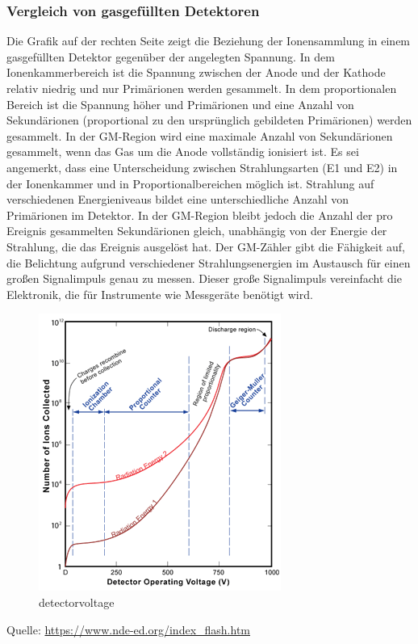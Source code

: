 {\subsubsection{Vergleich von gasgefüllten Detektoren}
Die Grafik auf der rechten Seite zeigt die Beziehung der Ionensammlung in einem gasgefüllten Detektor gegenüber der angelegten Spannung. In dem Ionenkammerbereich ist die Spannung zwischen der Anode und der Kathode relativ niedrig und nur Primärionen werden gesammelt. In dem proportionalen Bereich ist die Spannung höher und Primärionen und eine Anzahl von Sekundärionen (proportional zu den ursprünglich gebildeten Primärionen) werden gesammelt. In der GM-Region wird eine maximale Anzahl von Sekundärionen gesammelt, wenn das Gas um die Anode vollständig ionisiert ist. Es sei angemerkt, dass eine Unterscheidung zwischen Strahlungsarten (E1 und E2) in der Ionenkammer und in Proportionalbereichen möglich ist. Strahlung auf verschiedenen Energieniveaus bildet eine unterschiedliche Anzahl von Primärionen im Detektor. In der GM-Region bleibt jedoch die Anzahl der pro Ereignis gesammelten Sekundärionen gleich, unabhängig von der Energie der Strahlung, die das Ereignis ausgelöst hat. Der GM-Zähler gibt die Fähigkeit auf, die Belichtung aufgrund verschiedener Strahlungsenergien im Austausch für einen großen Signalimpuls genau zu messen. Dieser große Signalimpuls vereinfacht die Elektronik, die für Instrumente wie Messgeräte benötigt wird.
\begin{figure}[htb]
\centering
  \includegraphics[scale=0.9]{img/detectorvoltage.png}
  \caption{detectorvoltage}
  \label{fig:detectorvoltage}
\end{figure}
Quelle: \url{https://www.nde-ed.org/index_flash.htm}
}
